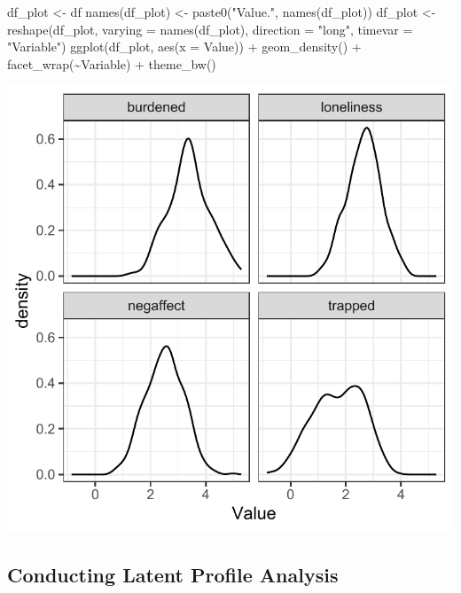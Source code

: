 \documentclass[
  man,floatsintext]{apa6}
\newenvironment{Shaded}{\begin{snugshade}}{\end{snugshade}}
\newcommand{\AttributeTok}[1]{\textcolor[rgb]{0.77,0.63,0.00}{#1}}
\newcommand{\FunctionTok}[1]{\textcolor[rgb]{0.00,0.00,0.00}{#1}}
\newcommand{\NormalTok}[1]{#1}
\newcommand{\OtherTok}[1]{\textcolor[rgb]{0.56,0.35,0.01}{#1}}
\newcommand{\SpecialCharTok}[1]{\textcolor[rgb]{0.00,0.00,0.00}{#1}}
\newcommand{\StringTok}[1]{\textcolor[rgb]{0.31,0.60,0.02}{#1}}
\begin{document}
\begin{Shaded}
\begin{Highlighting}[]
\NormalTok{df\_plot }\OtherTok{\textless{}{-}}\NormalTok{ df}
\FunctionTok{names}\NormalTok{(df\_plot) }\OtherTok{\textless{}{-}} \FunctionTok{paste0}\NormalTok{(}\StringTok{"Value."}\NormalTok{, }\FunctionTok{names}\NormalTok{(df\_plot))}
\NormalTok{df\_plot }\OtherTok{\textless{}{-}} \FunctionTok{reshape}\NormalTok{(df\_plot, }\AttributeTok{varying =} \FunctionTok{names}\NormalTok{(df\_plot), }\AttributeTok{direction =} \StringTok{"long"}\NormalTok{,}
    \AttributeTok{timevar =} \StringTok{"Variable"}\NormalTok{)}
\FunctionTok{ggplot}\NormalTok{(df\_plot, }\FunctionTok{aes}\NormalTok{(}\AttributeTok{x =}\NormalTok{ Value)) }\SpecialCharTok{+} \FunctionTok{geom\_density}\NormalTok{() }\SpecialCharTok{+} \FunctionTok{facet\_wrap}\NormalTok{(}\SpecialCharTok{\textasciitilde{}}\NormalTok{Variable) }\SpecialCharTok{+}
    \FunctionTok{theme\_bw}\NormalTok{()}
\end{Highlighting}
\end{Shaded}

\includegraphics{appendices/plot_lpa_desc.pdf}

\hypertarget{conducting-latent-profile-analysis}{%
\subsection{Conducting Latent Profile Analysis}\label{conducting-latent-profile-analysis}}
\end{document}

